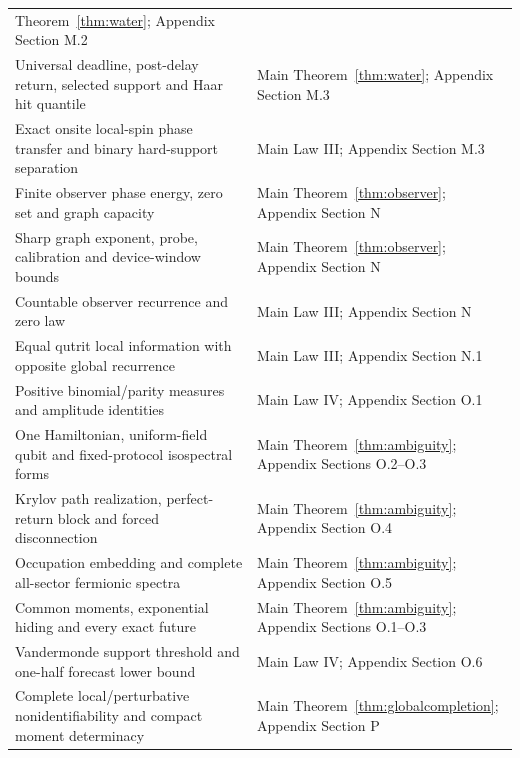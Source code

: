 \begin{longtable}{@{}>{\raggedright\arraybackslash}p{}
  >{\raggedright\arraybackslash}p{}@{}}
Theorem~\ref{thm:water}; Appendix Section M.2 \\
Universal deadline, post-delay return, selected support and Haar hit quantile
& Main Theorem~\ref{thm:water}; Appendix Section M.3 \\
Exact onsite local-spin phase transfer and binary hard-support separation &
Main Law III; Appendix Section M.3 \\
Finite observer phase energy, zero set and graph capacity & Main
Theorem~\ref{thm:observer};
Appendix Section N \\
Sharp graph exponent, probe, calibration and device-window bounds & Main
Theorem~\ref{thm:observer}; Appendix Section N \\
Countable observer recurrence and zero law & Main Law III; Appendix Section
N \\
Equal qutrit local information with opposite global recurrence & Main Law
III; Appendix Section N.1 \\
Positive binomial/parity measures and amplitude identities & Main Law IV;
Appendix Section O.1 \\
One Hamiltonian, uniform-field qubit and fixed-protocol isospectral forms &
Main Theorem~\ref{thm:ambiguity}; Appendix Sections O.2--O.3 \\
Krylov path realization, perfect-return block and forced disconnection & Main
Theorem~\ref{thm:ambiguity}; Appendix Section O.4 \\
Occupation embedding and complete all-sector fermionic spectra & Main
Theorem~\ref{thm:ambiguity}; Appendix Section O.5 \\
Common moments, exponential hiding and every exact future & Main
Theorem~\ref{thm:ambiguity};
Appendix Sections O.1--O.3 \\
Vandermonde support threshold and one-half forecast lower bound & Main Law IV;
Appendix Section O.6 \\
Complete local/perturbative nonidentifiability and compact moment determinacy &
Main Theorem~\ref{thm:globalcompletion}; Appendix Section P \\
\bottomrule
\end{longtable}
